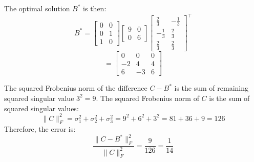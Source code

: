 \begin{homeworkProblem}
\begin{solution}
\begin{itemize}
                    The optimal solution $B^*$ is then:
                    \[
                        B^* = \begin{bmatrix}
                            0 & 0 \\
                            0 & 1 \\
                            1 & 0
                        \end{bmatrix}
                        \begin{bmatrix}
                            9 & 0 \\
                            0 & 6
                        \end{bmatrix}
                        \begin{bmatrix}
                            \frac{2}{3} & -\frac{1}{3} \\
                            -\frac{1}{3} & \frac{2}{3} \\
                            \frac{2}{3} & \frac{2}{3}
                        \end{bmatrix}^\top
                    \]
                    \[
                        = \begin{bmatrix}
                            0 & 0 & 0 \\
                            -2 & 4 & 4 \\
                            6 & -3 & 6
                        \end{bmatrix}
                    \]

                    The squared Frobenius norm of the difference $C - B^*$ is
                    the sum of remaining squared singular value $3^2 = 9$. The 
                    squared Frobenius norm of $C$ is the sum of squared
                    singular values:
                    \[
                        \|C\|_F^2 = \sigma_1^2 + \sigma_2^2 + \sigma_3^2
                            = 9^2 + 6^2 + 3^2 = 81 + 36 + 9 = 126
                    \]
                    Therefore, the error is:
                    \[
                        \frac{\|C - B^*\|_F^2}{\|C\|_F^2} = \frac{9}{126} = \frac{1}{14}
                    \]
            \end{itemize}
    \end{solution}

\end{homeworkProblem}